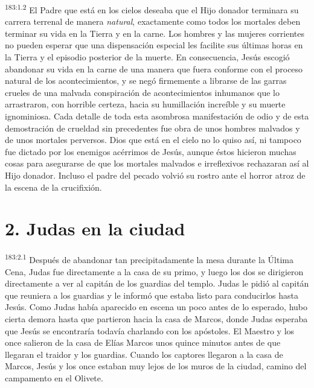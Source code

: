 \par
\textsuperscript{183:1.2} El Padre que está en los cielos deseaba que el Hijo donador terminara su carrera terrenal de manera \textit{natural}, exactamente como todos los mortales deben terminar su vida en la Tierra y en la carne. Los hombres y las mujeres corrientes no pueden esperar que una dispensación especial les facilite sus últimas horas en la Tierra y el episodio posterior de la muerte. En consecuencia, Jesús escogió abandonar su vida en la carne de una manera que fuera conforme con el proceso natural de los acontecimientos, y se negó firmemente a librarse de las garras crueles de una malvada conspiración de acontecimientos inhumanos que lo arrastraron, con horrible certeza, hacia su humillación increíble y su muerte ignominiosa. Cada detalle de toda esta asombrosa manifestación de odio y de esta demostración de crueldad sin precedentes fue obra de unos hombres malvados y de unos mortales perversos. Dios que está en el cielo no lo quiso así, ni tampoco fue dictado por los enemigos acérrimos de Jesús, aunque éstos hicieron muchas cosas para asegurarse de que los mortales malvados e irreflexivos rechazaran así al Hijo donador. Incluso el padre del pecado volvió su rostro ante el horror atroz de la escena de la crucifixión.

\section*{2. Judas en la ciudad}
\par
\textsuperscript{183:2.1} Después de abandonar tan precipitadamente la mesa durante la Última Cena, Judas fue directamente a la casa de su primo, y luego los dos se dirigieron directamente a ver al capitán de los guardias del templo. Judas le pidió al capitán que reuniera a los guardias y le informó que estaba listo para conducirlos hasta Jesús. Como Judas había aparecido en escena un poco antes de lo esperado, hubo cierta demora hasta que partieron hacia la casa de Marcos, donde Judas esperaba que Jesús se encontraría todavía charlando con los apóstoles. El Maestro y los once salieron de la casa de Elías Marcos unos quince minutos antes de que llegaran el traidor y los guardias. Cuando los captores llegaron a la casa de Marcos, Jesús y los once estaban muy lejos de los muros de la ciudad, camino del campamento en el Olivete.


